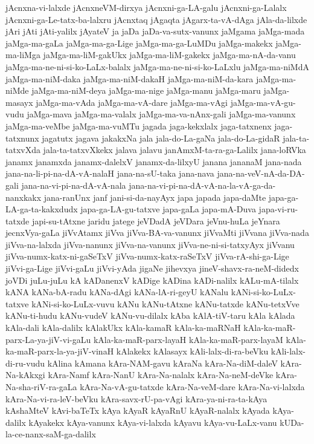 {jAcnxna-vi-lalxde
jAcnxneVM-dirxya
jAcnxni-ga-LA-galu
jAcnxni-ga-Lalalx
jAcnxni-ga-Le-tatx-ba-lalxru
jAcnxtaq
jAgaqta
jAgarx-ta-vA-dAga
jAla-da-lilxde
jAri
jAti
jAti-yalilx
jAyateV
ja
jaDa
jaDa-va-sutx-vanunx
jaMgama
jaMga-mada
jaMga-ma-gaLa
jaMga-ma-ga-Lige
jaMga-ma-ga-LuMDu
jaMga-makekx
jaMga-ma-liMga
jaMga-ma-liM-gakUkx
jaMga-ma-liM-gakekx
jaMga-ma-nA-da-vanu
jaMga-ma-ne-ni-si-ko-LaLx-balalx
jaMga-ma-ne-ni-si-ko-LaLxlu
jaMga-ma-niMdA
jaMga-ma-niM-daka
jaMga-ma-niM-dakaH
jaMga-ma-niM-da-kara
jaMga-ma-niMde
jaMga-ma-niM-deya
jaMga-ma-nige
jaMga-manu
jaMga-maru
jaMga-masayx
jaMga-ma-vAda
jaMga-ma-vA-dare
jaMga-ma-vAgi
jaMga-ma-vA-gu-vudu
jaMga-mava
jaMga-ma-valalx
jaMga-ma-va-nAnx-gali
jaMga-ma-vanunx
jaMga-ma-veMbe
jaMga-ma-vuMTu
jagada
jaga-kekxlalx
jaga-tatxnenx
jaga-tatxnunx
jagatutx
jagava
jakakxNa
jala
jala-do-La-gaNa
jala-do-La-gidaR
jala-ta-tatxvXda
jala-ta-tatxvXkekx
jalava
jalavu
janAmxM-ta-ra-ga-Lalilx
jana-loRVka
janamx
janamxda
janamx-dalelxV
janamx-da-lilxyU
janana
jananaM
jana-nada
jana-na-li-pi-na-dA-vA-nalaH
jana-na-sU-taka
jana-nava
jana-na-veV-nA-da-DA-gali
jana-na-vi-pi-na-dA-vA-nala
jana-na-vi-pi-na-dA-vA-na-la-vA-ga-da-nanxkakx
jana-ranUnx
janf
jani-si-da-nayAyx
japa
japada
japa-daMte
japa-ga-LA-ga-ta-kakxdudx
japa-ga-LA-gu-tatxve
japa-gaLa
japa-mA-Duva
japa-vi-ru-tatxde
japi-su-tAtxne
jaridu
jatege
jeVDadA
jeVDara
jeVnu-huLa
jeYnara
jecnxVya-gaLa
jiVvAtamx
jiVva
jiVva-BA-va-vanunx
jiVvaMti
jiVvana
jiVva-nada
jiVva-na-lalxda
jiVva-nanunx
jiVva-na-vanunx
jiVva-ne-ni-si-tatxyAyx
jiVvanu
jiVva-numx-katx-ni-gaSeTxV
jiVva-numx-katx-raSeTxV
jiVva-rA-shi-ga-Lige
jiVvi-ga-Lige
jiVvi-gaLu
jiVvi-yAda
jigaNe
jihevxya
jineV-shavx-ra-neM-didedx
joVDi
juLu-juLu
kA
kADanenxV
kADige
kADina
kADi-nalilx
kALu-mA-tilalx
kANA
kANa-bA-radu
kANa-dAgi
kANa-lA-ri-geyU
kANalu
kANi-si-ko-LuLx-tatxve
kANi-si-ko-LuLx-vuvu
kANu
kANu-tAtxne
kANu-tatxde
kANu-tetxVve
kANu-ti-hudu
kANu-vudeV
kANu-vu-dilalx
kAba
kAlA-tiV-taru
kAla
kAlada
kAla-dali
kAla-dalilx
kAlakUkx
kAla-kamaR
kAla-ka-maRNaH
kAla-ka-maR-parx-La-ya-jiV-vi-gaLu
kAla-ka-maR-parx-layaH
kAla-ka-maR-parx-layaM
kAla-ka-maR-parx-la-ya-jiV-vinaH
kAlakekx
kAlasayx
kAli-lalx-di-ra-beVku
kAli-lalx-di-ru-vudu
kAlina
kAmana
kAra-NAM-gavu
kAraNa
kAra-Na-diM-daleV
kAra-Na-kAkxgi
kAra-Namf
kAra-NanU
kAra-Na-nalalx
kAra-Na-neM-deVke
kAra-Na-sha-riV-ra-gaLa
kAra-Na-vA-gu-tatxde
kAra-Na-veM-dare
kAra-Na-vi-lalxda
kAra-Na-vi-ra-leV-beVku
kAra-savx-rU-pa-vAgi
kAra-ya-ni-ra-ta-kAya
kAshaMteV
kAvi-baTeTx
kAya
kAyaR
kAyaRnU
kAyaR-nalalx
kAyada
kAya-dalilx
kAyakekx
kAya-vanunx
kAya-vi-lalxda
kAyavu
kAya-vu-LaLx-vanu
kUDa-la-ce-nanx-saM-ga-dalilx
}
